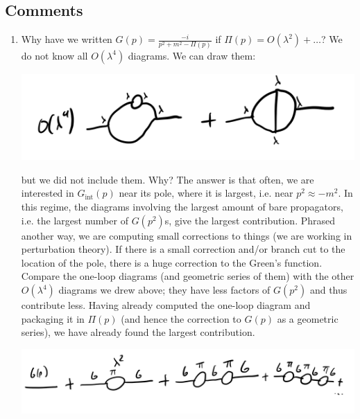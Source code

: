 \subsection{Comments}
\begin{enumerate}
    \item Why have we written $G(p) = \frac{-i}{p^2 + m^2 - \Pi(p)}$ if $\Pi(p) = O(\lambda^2) + \ldots$? We do not know all $O(\lambda^4)$ diagrams. We can draw them:
    \begin{center}
        \includegraphics[scale=0.3]{Lectures/Figures/lec13-lambda4.png}
    \end{center}
    but we did not include them. Why? The answer is that often, we are interested in $G_{\text{int}}(p)$ near its pole, where it is largest, i.e. near $p^2 \approx -m^2$. In this regime, the diagrams involving the largest amount of bare propagators, i.e. the largest number of $G(p^2)$s, give the largest contribution. Phrased another way, we are computing small corrections to things (we are working in perturbation theory). If there is a small correction and/or branch cut to the location of the pole, there is a huge correction to the Green's function. Compare the one-loop diagrams (and geometric series of them) with the other $O(\lambda^4)$ diagrams we drew above; they have less factors of $G(p^2)$ and thus contribute less. Having already computed the one-loop diagram and packaging it in $\Pi(p)$ (and hence the correction to $G(p)$ as a geometric series), we have already found the largest contribution.
    \begin{center}
        \includegraphics[scale=0.3]{Lectures/Figures/lec13-geomseries.png}
    \end{center}


\end{enumerate}
